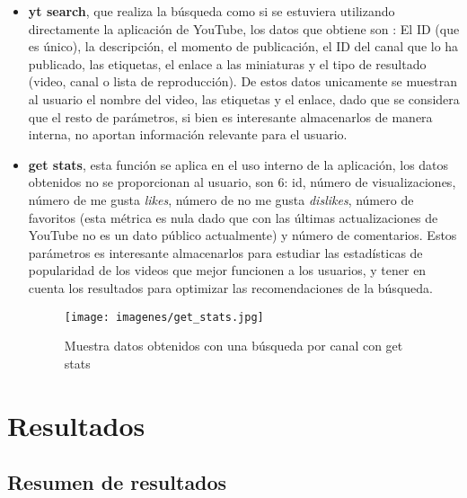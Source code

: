 \documentclass[a4paper,12pt,twoside]{memoir}
\begin{document}
\begin{itemize}
    \item \textbf{yt search}, que realiza la búsqueda como si se estuviera utilizando directamente la aplicación de YouTube, los datos que obtiene son : El ID (que es único), la descripción, el momento de publicación, el ID del canal que lo ha publicado, las etiquetas, el enlace a las miniaturas y el tipo de resultado (video, canal o lista de reproducción). De estos datos unicamente se muestran al usuario el nombre del video, las etiquetas y el enlace, dado que se considera que el resto de parámetros, si bien es interesante almacenarlos de manera interna, no aportan información relevante para el usuario.
    \item \textbf{get stats}, esta función se aplica en el uso interno de la aplicación, los datos obtenidos no se proporcionan al usuario, son 6: id, número de visualizaciones, número de me gusta \textit{likes}, número de no me gusta \textit{dislikes}, número de favoritos (esta métrica es nula dado que con las últimas actualizaciones de YouTube no es un dato público actualmente) y número de comentarios. Estos parámetros es interesante almacenarlos para estudiar las estadísticas de popularidad de los videos que mejor funcionen a los usuarios, y tener en cuenta los resultados para optimizar las recomendaciones de la búsqueda.
    \begin{figure}
        \centering
        \texttt{[image: imagenes/get\_stats.jpg]} 
        \caption{Muestra datos obtenidos con una búsqueda por canal con get stats}
        \label{fig:ejemplo}
    \end{figure}

\end{itemize}




\chapter{Resultados}
\section{Resumen de resultados}
\end{document}

